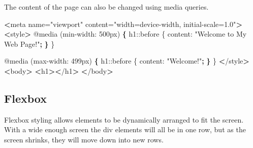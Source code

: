 \documentclass[]{book}
\newenvironment{Shaded}{\begin{snugshade}}{\end{snugshade}}
\newcommand{\ExtensionTok}[1]{#1}
\newcommand{\KeywordTok}[1]{\textcolor[rgb]{0.13,0.29,0.53}{\textbf{#1}}}
\newcommand{\NormalTok}[1]{#1}
\newcommand{\OperatorTok}[1]{\textcolor[rgb]{0.81,0.36,0.00}{\textbf{#1}}}
\newcommand{\StringTok}[1]{\textcolor[rgb]{0.31,0.60,0.02}{#1}}
\begin{document}
The content of the page can also be changed using media queries.

\begin{Shaded}
\begin{Highlighting}[]
\OperatorTok{<}\ExtensionTok{meta}\NormalTok{ name=}\StringTok{"viewport"}\NormalTok{ content=}\StringTok{"width=device-width, initial-scale=1.0"}\OperatorTok{>}
\OperatorTok{<}\ExtensionTok{style}\OperatorTok{>}
    \ExtensionTok{@media}\NormalTok{ (min-width: 500px) }\KeywordTok{\{}
        \ExtensionTok{h1}\NormalTok{::before \{}
            \ExtensionTok{content}\NormalTok{: }\StringTok{"Welcome to My Web Page!"}\KeywordTok{;}
        \KeywordTok{\}}
\NormalTok{    \}}

    \ExtensionTok{@media}\NormalTok{ (max-width: 499px) }\KeywordTok{\{}
        \ExtensionTok{h1}\NormalTok{::before \{}
            \ExtensionTok{content}\NormalTok{: }\StringTok{"Welcome!"}\KeywordTok{;}
        \KeywordTok{\}}
\NormalTok{    \}}
\OperatorTok{<}\NormalTok{/}\ExtensionTok{style}\OperatorTok{>}
\OperatorTok{<}\ExtensionTok{body}\OperatorTok{>}
    \OperatorTok{<}\ExtensionTok{h1}\OperatorTok{><}\NormalTok{/h1}\OperatorTok{>}
\OperatorTok{<}\NormalTok{/}\ExtensionTok{body}\OperatorTok{>}
\end{Highlighting}
\end{Shaded}

\hypertarget{flexbox}{%
\subsection{Flexbox}\label{flexbox}}

Flexbox styling allows elements to be dynamically arranged to fit the screen. With a wide enough screen the div elements will all be in one row, but as the screen shrinks, they will move down into new rows.
\end{document}
